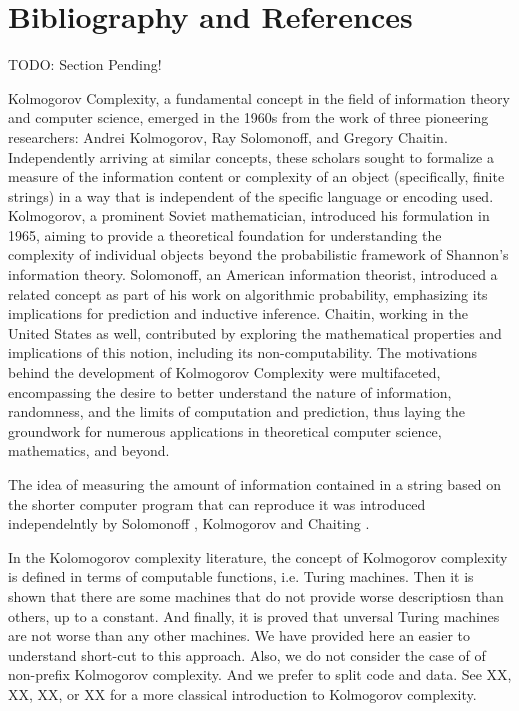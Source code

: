%
%

\section*{Bibliography and References}

{\color{red} TODO: Section Pending!}

{\color{red} Kolmogorov Complexity, a fundamental concept in the field of information theory and computer science, emerged in the 1960s from the work of three pioneering researchers: Andrei Kolmogorov, Ray Solomonoff, and Gregory Chaitin. Independently arriving at similar concepts, these scholars sought to formalize a measure of the information content or complexity of an object (specifically, finite strings) in a way that is independent of the specific language or encoding used. Kolmogorov, a prominent Soviet mathematician, introduced his formulation in 1965, aiming to provide a theoretical foundation for understanding the complexity of individual objects beyond the probabilistic framework of Shannon's information theory. Solomonoff, an American information theorist, introduced a related concept as part of his work on algorithmic probability, emphasizing its implications for prediction and inductive inference. Chaitin, working in the United States as well, contributed by exploring the mathematical properties and implications of this notion, including its non-computability. The motivations behind the development of Kolmogorov Complexity were multifaceted, encompassing the desire to better understand the nature of information, randomness, and the limits of computation and prediction, thus laying the groundwork for numerous applications in theoretical computer science, mathematics, and beyond. }


The idea of measuring the amount of information contained in a string based on the shorter computer program that can reproduce it was introduced independelntly by Solomonoff \cite{solomonoff1964formal}, Kolmogorov \cite{kolmogorov1965three} and Chaiting \cite{chaitin1969simplicity}.

In the Kolomogorov complexity literature, the concept of Kolmogorov complexity is defined in terms of computable functions, i.e. Turing machines. Then it is shown that there are some machines that do not provide worse descriptiosn than others, up to a constant. And finally, it is proved that unversal Turing machines are not worse than any other machines. We have provided here an easier to understand short-cut to this approach. Also, we do not consider the case of of non-prefix Kolmogorov complexity. And we prefer to split code and data. See XX, XX, XX, or XX for a more classical introduction to Kolmogorov complexity.


